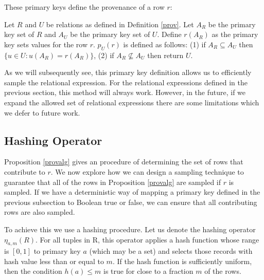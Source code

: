These primary keys define the provenance of a row $r$:
\begin{proposition}\label{provalg}
Let $R$ and $U$ be relations as defined in Definition \ref{prov}. 
Let $A_R$ be the primary key set of $R$ and $A_U$ be the primary key 
set of $U$.
Define $r(A_R)$ as the primary key sets values for the row $r$.
$p_U(r)$ is defined as follows: (1) if $A_R \subseteq A_U$ then 
$\{u \in U: u(A_R) = r(A_R)\}$, (2) if $A_R \not \subseteq A_U$ then
return $U$.
\end{proposition}

As we will subsequently see, this primary key definition allows us to efficiently sample the relational expression.
For the relational expressions defined in the previous section, this method will always work.
However, in the future, if we expand the allowed set of relational expressions there are some limitations which we defer to future work.

\subsection{Hashing Operator}
\label{push}
Proposition \ref{provalg} gives an procedure of determining the set of rows that contribute to $r$. 
We now explore how we can design a sampling technique to guarantee that all of the rows in Proposition \ref{provalg} are sampled if $r$ is sampled.
If we have a deterministic way of mapping a primary key defined in the previous subsection to Boolean true or false, we can ensure that all contributing rows are also sampled. 

To achieve this we use a hashing procedure.
Let us denote the hashing operator $\eta_{a, m}(R)$. 
For all tuples in R, this operator applies a hash function whose range is $[0,1]$ to primary key $a$ (which may be a set) and selects those records with hash value less than or equal to $m$.
If the hash function is sufficiently uniform, then the condition $h(a) \le m$ is true for close to a fraction $m$ of the rows. 

